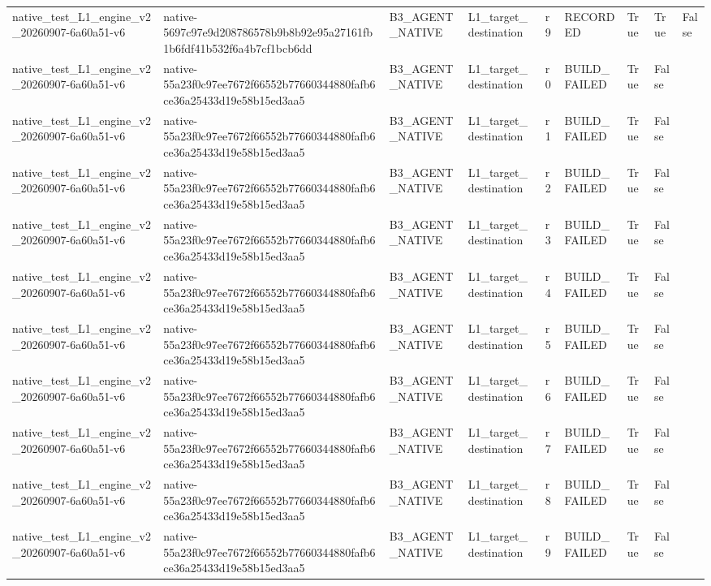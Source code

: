 \begin{tabular}{lllllllll}
native\_test\_L1\_engine\_v2\_20260907-6a60a51-v6 & native-5697c97e9d208786578b9b8b92e95a27161fb1b6fdf41b532f6a4b7cf1bcb6dd & B3\_AGENT\_NATIVE & L1\_target\_destination & r9 & RECORDED & True & True & False \\
native\_test\_L1\_engine\_v2\_20260907-6a60a51-v6 & native-55a23f0c97ee7672f66552b77660344880fafb6ce36a25433d19e58b15ed3aa5 & B3\_AGENT\_NATIVE & L1\_target\_destination & r0 & BUILD\_FAILED & True & False &  \\
native\_test\_L1\_engine\_v2\_20260907-6a60a51-v6 & native-55a23f0c97ee7672f66552b77660344880fafb6ce36a25433d19e58b15ed3aa5 & B3\_AGENT\_NATIVE & L1\_target\_destination & r1 & BUILD\_FAILED & True & False &  \\
native\_test\_L1\_engine\_v2\_20260907-6a60a51-v6 & native-55a23f0c97ee7672f66552b77660344880fafb6ce36a25433d19e58b15ed3aa5 & B3\_AGENT\_NATIVE & L1\_target\_destination & r2 & BUILD\_FAILED & True & False &  \\
native\_test\_L1\_engine\_v2\_20260907-6a60a51-v6 & native-55a23f0c97ee7672f66552b77660344880fafb6ce36a25433d19e58b15ed3aa5 & B3\_AGENT\_NATIVE & L1\_target\_destination & r3 & BUILD\_FAILED & True & False &  \\
native\_test\_L1\_engine\_v2\_20260907-6a60a51-v6 & native-55a23f0c97ee7672f66552b77660344880fafb6ce36a25433d19e58b15ed3aa5 & B3\_AGENT\_NATIVE & L1\_target\_destination & r4 & BUILD\_FAILED & True & False &  \\
native\_test\_L1\_engine\_v2\_20260907-6a60a51-v6 & native-55a23f0c97ee7672f66552b77660344880fafb6ce36a25433d19e58b15ed3aa5 & B3\_AGENT\_NATIVE & L1\_target\_destination & r5 & BUILD\_FAILED & True & False &  \\
native\_test\_L1\_engine\_v2\_20260907-6a60a51-v6 & native-55a23f0c97ee7672f66552b77660344880fafb6ce36a25433d19e58b15ed3aa5 & B3\_AGENT\_NATIVE & L1\_target\_destination & r6 & BUILD\_FAILED & True & False &  \\
native\_test\_L1\_engine\_v2\_20260907-6a60a51-v6 & native-55a23f0c97ee7672f66552b77660344880fafb6ce36a25433d19e58b15ed3aa5 & B3\_AGENT\_NATIVE & L1\_target\_destination & r7 & BUILD\_FAILED & True & False &  \\
native\_test\_L1\_engine\_v2\_20260907-6a60a51-v6 & native-55a23f0c97ee7672f66552b77660344880fafb6ce36a25433d19e58b15ed3aa5 & B3\_AGENT\_NATIVE & L1\_target\_destination & r8 & BUILD\_FAILED & True & False &  \\
native\_test\_L1\_engine\_v2\_20260907-6a60a51-v6 & native-55a23f0c97ee7672f66552b77660344880fafb6ce36a25433d19e58b15ed3aa5 & B3\_AGENT\_NATIVE & L1\_target\_destination & r9 & BUILD\_FAILED & True & False &  \\

\end{tabular}

